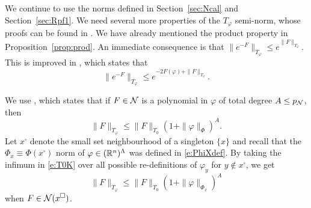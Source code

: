 We continue to use the norms defined in Section~\ref{sec:Ncal} and Section~\ref{sec:Rpf1}.
We need several more properties of the $T_\varphi$ semi-norm, whose proofs can be found in
\cite{BS-rg-norm}. We have already mentioned the product property in Proposition~\ref{prop:prod}.
An immediate consequence is that $\|e^{-F}\|_{T_\varphi} \leq e^{\|F\|_{T_\varphi}}$.
This is improved in \cite[Proposition~\ref{norm-prop:eK}]{BS-rg-norm},
which states that
\begin{equation}
\label{e:eK}
\|e^{-F}\|_{T_\varphi} \leq e^{-2 F(\varphi) + \|F\|_{T_\varphi}}.
\end{equation}

We use \cite[Proposition~\ref{norm-prop:T0K}]{BS-rg-norm},
which states that if $F \in \mathcal{N}$ is a polynomial in $\varphi$ of
total degree $A \leq p_{\mathcal{N}}$, then
\begin{equation}
\label{e:T0K}
\|F\|_{T_\varphi} \leq \|F\|_{T_0} (1 + \|\varphi\|_\Phi)^A.
\end{equation}
Let $x^\square$ denote the small set neighbourhood of a singleton $\{x\}$
and recall that
the $\Phi_x \equiv \Phi(x^\square)$ norm of $\varphi \in ({\mathbb R}^n)^\Lambda$ was defined
in \eqref{e:PhiXdef}.
By taking the infimum in \eqref{e:T0K} over all possible
re-definitions of $\varphi_y$ for $y \notin x^\square$, we get
\begin{equation}
\label{e:T0Kx}
\|F\|_{T_\varphi}
  \leq
\|F\|_{T_0} (1 + \|\varphi\|_{\Phi_x})^A
\end{equation}
when $F \in \mathcal{N}(x^\square)$.

